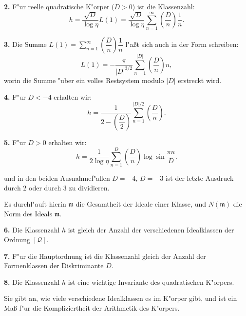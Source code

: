 \documentclass[11pt,a4paper]{article}
\theoremstyle{plain}
\begin{document}
\smallskip

\textbf{2.} F"{u}r reelle quadratische K"{o}rper ($D > 0$) ist die Klassenzahl:
\begin{equation}
\label{eq:112_2}
h = \frac{\sqrt{D}}{\log\eta} L(1) = \frac{\sqrt{D}}{\log\eta} \sum_{n=1}^{\infty} \left(\frac{D}{n}\right) \frac{1}{n}.
\end{equation}

\smallskip

\textbf{3.} Die Summe $L(1) = \sum\limits_{n=1}^{\infty} \left(\dfrac{D}{n}\right) \dfrac{1}{n}$ l"{a}\ss{}t sich auch in der Form schreiben:
\begin{equation}
\label{eq:112_3}
L(1) = -\frac{\pi}{|D|^{3/2}} \sum_{n=1}^{|D|} \left(\frac{D}{n}\right) n,
\end{equation}
worin die Summe "{u}ber ein volles Restsystem modulo $|D|$ erstreckt wird.

\smallskip

\textbf{4.} F"{u}r $D < -4$ erhalten wir:
\[
h = \frac{1}{2 - \left(\dfrac{D}{2}\right)} \sum_{n=1}^{|D|/2} \left(\frac{D}{n}\right).
\]

\smallskip

\textbf{5.} F"{u}r $D > 0$ erhalten wir:
\[
h = \frac{1}{2\log\eta} \sum_{n=1}^{D} \left(\frac{D}{n}\right) \log\sin\frac{\pi n}{D}.
\]

\newpage
\setcounter{page}{405}

und in den beiden Ausnahmef"{a}llen $D = -4$, $D = -3$ ist der letzte Ausdruck durch $2$ oder durch $3$ zu dividieren.

Es durchl"{a}uft hierin $\mathfrak{m}$ die Gesamtheit der Ideale einer Klasse, und $N(\mathfrak{m})$ die Norm des Ideals $\mathfrak{m}$.

\smallskip

\textbf{6.} Die Klassenzahl $h$ ist gleich der Anzahl der verschiedenen Idealklassen der Ordnung $[\mathcal{Q}]$.

\smallskip

\textbf{7.} F"{u}r die Hauptordnung ist die Klassenzahl gleich der Anzahl der Formenklassen der Diskriminante $D$.

\smallskip

\textbf{8.} Die Klassenzahl $h$ ist eine wichtige Invariante des quadratischen K"{o}rpers.

Sie gibt an, wie viele verschiedene Idealklassen es im K"{o}rper gibt, und ist ein Ma\ss{} f"{u}r die Kompliziertheit der Arithmetik des K"{o}rpers.

\newpage
\setcounter{page}{406}
\end{document}
